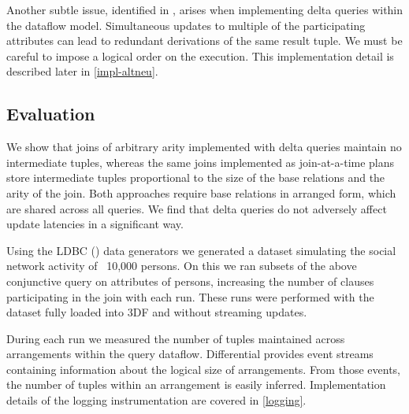 \documentclass[../catalog.tex]{subfiles}
\begin{document}
Another subtle issue, identified in \cite{dogsdogsdogs}, arises when
implementing delta queries within the dataflow model. Simultaneous
updates to multiple of the participating attributes can lead to
redundant derivations of the same result tuple. We must be careful to
impose a logical order on the execution. This implementation detail is
described later in \autoref{impl-altneu}.

\subsection{Evaluation}

We show that joins of arbitrary arity implemented with delta queries
maintain no intermediate tuples, whereas the same joins implemented as
join-at-a-time plans store intermediate tuples proportional to the
size of the base relations and the arity of the join. Both approaches
require base relations in arranged form, which are shared across all
queries. We find that delta queries do not adversely affect update
latencies in a significant way.

Using the LDBC (\cite{erling2015ldbc}) data generators we generated a
dataset simulating the social network activity of ~10,000 persons. On
this we ran subsets of the above conjunctive query on attributes of
persons, increasing the number of clauses participating in the join
with each run. These runs were performed with the dataset fully loaded
into 3DF and without streaming updates.

During each run we measured the number of tuples maintained across
arrangements within the query dataflow. Differential provides event
streams containing information about the logical size of
arrangements. From those events, the number of tuples within an
arrangement is easily inferred. Implementation details of the logging
instrumentation are covered in \autoref{logging}.
\end{document}
